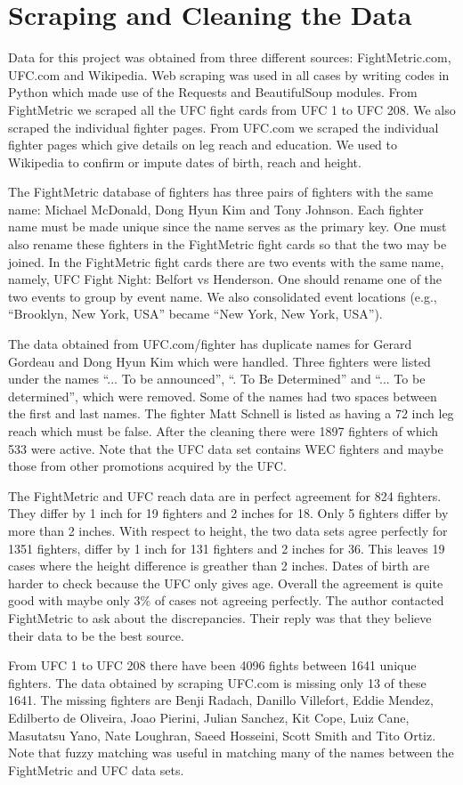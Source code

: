 \clearpage
\section{Scraping and Cleaning the Data}
\label{cleaning_data}
Data for this project was obtained from three different sources:
FightMetric.com, UFC.com and Wikipedia. Web scraping was used
in all cases by writing codes in Python which made use
of the Requests and BeautifulSoup modules. From FightMetric we scraped all the UFC fight
cards from UFC 1 to UFC 208. We also scraped the individual fighter
pages. From UFC.com we scraped the individual fighter pages which
give details on leg reach and education. We used to Wikipedia
to confirm or impute dates of birth, reach and height.

The FightMetric database of fighters has three pairs of fighters
with the same name: Michael McDonald, Dong Hyun Kim and
Tony Johnson. Each fighter name must be made unique since the name
serves as the primary key. One must also rename these fighters
in the FightMetric fight cards so that the two may be joined.
In the FightMetric fight cards there are two events with the same
name, namely, UFC Fight Night: Belfort vs Henderson. One should rename
one of the two events to group by event name. We also consolidated
event locations (e.g., ``Brooklyn, New York, USA'' became ``New York, New York, USA'').

The data obtained from UFC.com/fighter has duplicate names for
Gerard Gordeau and Dong Hyun Kim which were handled. Three fighters were
listed under the names ``... To be announced'', ``. To Be Determined'' and
``... To be determined'', which were removed. Some of the names had
two spaces between the first and last names. The fighter Matt Schnell
is listed as having a 72 inch leg reach which must be false.
After the cleaning there were 1897 fighters of which 533 were active. Note that
the UFC data set contains WEC fighters and maybe those from other promotions
acquired by the UFC.

The FightMetric and UFC reach data are in perfect agreement for 824 fighters.
They differ by 1 inch for 19 fighters and 2 inches for 18. Only 5 fighters
differ by more than 2 inches.
With respect to height, the two data sets agree perfectly for 1351 fighters,
differ by 1 inch for 131 fighters and 2 inches for 36. This leaves 19
cases where the height difference is greather than 2 inches. Dates of birth
are harder to check because the UFC only gives age.
Overall the agreement is quite good with maybe only 3\% of cases not
agreeing perfectly.
The author contacted FightMetric to ask about the discrepancies. Their reply
was that they believe their data to be the best source.

From UFC 1 to UFC 208 there have been 4096 fights between 1641 unique fighters. The
data obtained by scraping UFC.com is missing only 13 of these 1641. The missing
fighters are Benji Radach, Danillo Villefort, Eddie Mendez, Edilberto de Oliveira,
Joao Pierini, Julian Sanchez, Kit Cope, Luiz Cane, Masutatsu Yano, Nate Loughran,
Saeed Hosseini, Scott Smith and Tito Ortiz. Note that fuzzy matching was useful
in matching many of the names between the FightMetric and UFC data sets.

